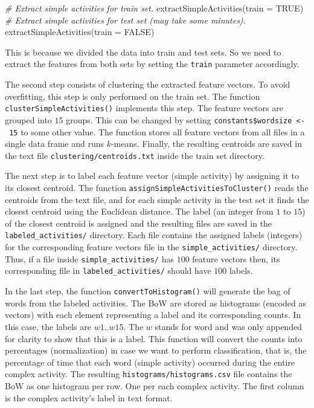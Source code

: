 \documentclass[
  11pt,
]{krantz}
\newenvironment{Shaded}{\begin{snugshade}}{\end{snugshade}}
\newcommand{\AttributeTok}[1]{\textcolor[rgb]{0.61,0.61,0.61}{#1}}
\newcommand{\CommentTok}[1]{\textcolor[rgb]{0.37,0.37,0.37}{\textit{#1}}}
\newcommand{\ConstantTok}[1]{\textcolor[rgb]{0,0,0}{#1}}
\newcommand{\FunctionTok}[1]{\textcolor[rgb]{0,0,0}{#1}}
\newcommand{\NormalTok}[1]{#1}
\begin{document}
\begin{Shaded}
\begin{Highlighting}[]
\CommentTok{\# Extract simple activities for train set.}
\FunctionTok{extractSimpleActivities}\NormalTok{(}\AttributeTok{train =} \ConstantTok{TRUE}\NormalTok{)}
\CommentTok{\# Extract simple activities for test set (may take some minutes).}
\FunctionTok{extractSimpleActivities}\NormalTok{(}\AttributeTok{train =} \ConstantTok{FALSE}\NormalTok{)}
\end{Highlighting}
\end{Shaded}

This is because we divided the data into train and test sets. So we need to extract the features from both sets by setting the \texttt{train} parameter accordingly.

The second step consists of clustering the extracted feature vectors. To avoid overfitting, this step is only performed on the train set. The function \texttt{clusterSimpleActivities()} implements this step. The feature vectors are grouped into \(15\) groups. This can be changed by setting \texttt{constants\$wordsize\ \textless{}-\ 15} to some other value. The function stores all feature vectors from all files in a single data frame and runs \(k\)-means. Finally, the resulting centroids are saved in the text file \texttt{clustering/centroids.txt} inside the train set directory.

The next step is to label each feature vector (simple activity) by assigning it to its closest centroid. The function \texttt{assignSimpleActivitiesToCluster()} reads the centroids from the text file, and for each simple activity in the test set it finds the closest centroid using the Euclidean distance. The label (an integer from \(1\) to \(15\)) of the closest centroid is assigned and the resulting files are saved in the \texttt{labeled\_activities/} directory. Each file contains the assigned labels (integers) for the corresponding feature vectors file in the \texttt{simple\_activities/} directory. Thus, if a file inside \texttt{simple\_activities/} has \(100\) feature vectors then, its corresponding file in \texttt{labeled\_activities/} should have \(100\) labels.

In the last step, the function \texttt{convertToHistogram()} will generate the bag of words from the labeled activities. The BoW are stored as histograms (encoded as vectors) with each element representing a label and its corresponding counts. In this case, the labels are \(w1..w15\). The \(w\) stands for word and was only appended for clarity to show that this is a label. This function will convert the counts into percentages (normalization) in case we want to perform classification, that is, the percentage of time that each word (simple activity) occurred during the entire complex activity. The resulting \texttt{histograms/histograms.csv} file contains the BoW as one histogram per row. One per each complex activity. The first column is the complex activity's label in text format.
\end{document}
